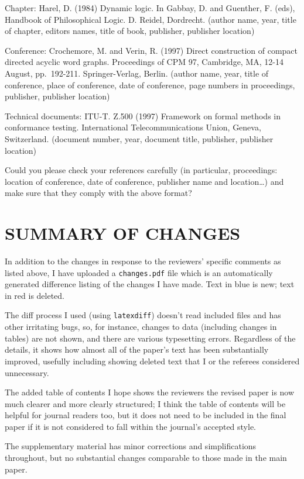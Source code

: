 \documentclass[11pt]{article}
\begin{document}
Chapter:
Harel, D. (1984) Dynamic logic. In Gabbay, D. and Guenther, F. (eds), Handbook of Philosophical Logic. D. Reidel, Dordrecht.
(author name, year, title of chapter, editors names, title of book, publisher, publisher location)

Conference:
Crochemore, M. and Verin, R. (1997) Direct construction of compact directed acyclic word graphs. Proceedings of CPM 97, Cambridge, MA, 12-14 August, pp.~192-211. Springer-Verlag, Berlin.
(author name, year, title of conference, place of conference, date of conference, page numbers in proceedings, publisher, publisher location)

Technical documents:
ITU-T. Z.500 (1997) Framework on formal methods in conformance testing. International Telecommunications Union, Geneva, Switzerland.
(document number, year, document title, publisher, publisher location)

Could you please check your references carefully (in particular, proceedings: location of conference, date of conference, publisher name and location\ldots) and make sure that they comply with the above format?

\color{red}
\section{SUMMARY OF CHANGES}
In addition to the changes in response to the reviewers' specific comments as listed above, I have uploaded a \texttt{changes.pdf} file which is an automatically generated difference listing of the changes I have made. Text in blue is new; text in red is deleted. 

The diff process I used (using \texttt{latexdiff}) doesn't read included files and has other irritating bugs, so, for instance, changes to data (including changes in tables) are not shown, and there are various typesetting errors. Regardless of the details, it shows how almost all of the paper's text has been substantially improved, usefully including showing deleted text that I or the referees considered unnecessary. 

The added table of contents I hope shows the reviewers the revised paper is now much clearer and more clearly structured; I think the table of contents will be helpful for journal readers too, but it does not need to be included in the final paper if it is not considered to fall within the journal's accepted style.

The supplementary material has minor corrections and simplifications throughout, but no substantial changes comparable to those made in the main paper.
\end{document}
